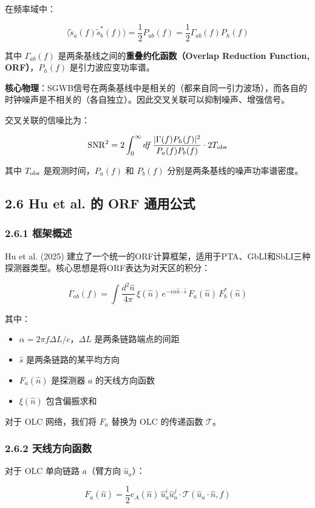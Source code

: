 \documentclass[12pt,a4paper]{article}
\begin{document}
在频率域中：

$$\langle \tilde{s}_a(f) \tilde{s}_b^*(f)\rangle = \frac{1}{2} P_{ab}(f) = \frac{1}{2} \Gamma_{ab}(f) P_h(f)$$

其中 $\Gamma_{ab}(f)$ 是两条基线之间的\textbf{重叠约化函数（Overlap Reduction Function, ORF）}，$P_h(f)$ 是引力波应变功率谱。

\textbf{核心物理}：SGWB信号在两条基线中是相关的（都来自同一引力波场），而各自的时钟噪声是不相关的（各自独立）。因此交叉关联可以抑制噪声、增强信号。

交叉关联的信噪比为：

$${\rm SNR}^2 = 2 \int_0^\infty df\, \frac{|\Gamma(f) P_h(f)|^2}{P_a(f) P_b(f)} \cdot 2T_{\rm obs}$$

其中 $T_{\rm obs}$ 是观测时间，$P_a(f)$ 和 $P_b(f)$ 分别是两条基线的噪声功率谱密度。

\subsection{2.6 Hu et al. 的 ORF 通用公式}


\subsubsection{2.6.1 框架概述}


Hu et al. (2025) 建立了一个统一的ORF计算框架，适用于PTA、GbLI和SbLI三种探测器类型。核心思想是将ORF表达为对天区的积分：

$$\Gamma_{ab}(f) = \int \frac{d^2\hat{n}}{4\pi}\, \xi(\hat{n})\, e^{-i\alpha \hat{n}\cdot\hat{s}}\, F_a(\hat{n})\, F_b^*(\hat{n})$$

其中：
\begin{itemize}
  \item $\alpha = 2\pi f \Delta L/c$，$\Delta L$ 是两条链路端点的间距
  \item $\hat{s}$ 是两条链路的某平均方向
  \item $F_a(\hat{n})$ 是探测器 $a$ 的天线方向函数
  \item $\xi(\hat{n})$ 包含偏振求和
\end{itemize}
对于 OLC 网络，我们将 $F_a$ 替换为 OLC 的传递函数 $\mathcal{T}$。
\subsubsection{2.6.2 天线方向函数}


对于 OLC 单向链路 $a$（臂方向 $\hat{u}_a$）：

$$F_a(\hat{n}) = \frac{1}{2} e_A(\hat{n})\, \hat{u}_a^i \hat{u}_a^j \cdot \mathcal{T}(\hat{u}_a\cdot\hat{n}, f)$$
\end{document}

